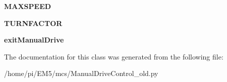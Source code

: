 \begin{DoxyCompactItemize}
{\bfseries M\+A\+X\+S\+P\+E\+ED}
\item 
\mbox{\label{classmcs_1_1ManualDriveControl__old_1_1ManualDriveControl_a40eeab6593180118c0dbc284c1c81919}} 
{\bfseries T\+U\+R\+N\+F\+A\+C\+T\+OR}
\item 
\mbox{\label{classmcs_1_1ManualDriveControl__old_1_1ManualDriveControl_ad5bb201a853c366aedfc5ab7f8150972}} 
{\bfseries exit\+Manual\+Drive}
\end{DoxyCompactItemize}


The documentation for this class was generated from the following file\+:\begin{DoxyCompactItemize}
\item 
/home/pi/\+E\+M5/mcs/Manual\+Drive\+Control\+\_\+old.\+py\end{DoxyCompactItemize}
